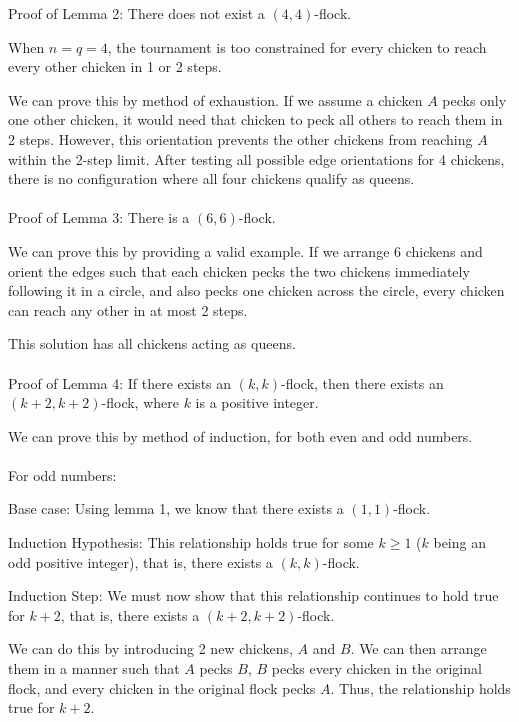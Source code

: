 \documentclass[answers]{exam}
\begin{document}
\begin{questions}
\begin{solution}
            Proof of Lemma 2: There does not exist a $(4,4)$-flock.

            When $n = q = 4$, the tournament is too constrained for every chicken to reach every other chicken in 1 or 2 steps.

            We can prove this by method of exhaustion. If we assume a chicken $A$ pecks only one other chicken, it would need that chicken to peck all others to reach them in 2 steps. However, this orientation prevents the other chickens from reaching $A$ within the 2-step limit. After testing all possible edge orientations for 4 chickens, there is no configuration where all four chickens qualify as queens.
            \\\\

            Proof of Lemma 3: There is a $(6, 6)$-flock.

            We can prove this by providing a valid example. If we arrange 6 chickens and orient the edges such that each chicken pecks the two chickens immediately following it in a circle, and also pecks one chicken across the circle, every chicken can reach any other in at most 2 steps.

            This solution has all chickens acting as queens.
            \\\\

            Proof of Lemma 4: If there exists an $(k, k)$-flock, then there exists an $(k + 2, k + 2)$-flock, where $k$ is a positive integer.

            We can prove this by method of induction, for both even and odd numbers.
            \\\\

            For odd numbers:
            
            Base case: Using lemma 1, we know that there exists a $(1, 1)$-flock.

            Induction Hypothesis: This relationship holds true for some $k \geq 1$ ($k$ being an odd positive integer), that is, there exists a $(k, k)$-flock.

            Induction Step: We must now show that this relationship continues to hold true for $k + 2$, that is, there exists a $(k+2, k+2)$-flock.

            We can do this by introducing 2 new chickens, $A$ and $B$. We can then arrange them in a manner such that $A$ pecks $B$, $B$ pecks every chicken in the original flock, and every chicken in the original flock pecks $A$. Thus, the relationship holds true for $k+2$.


\end{solution}
\end{questions}
\end{document}
